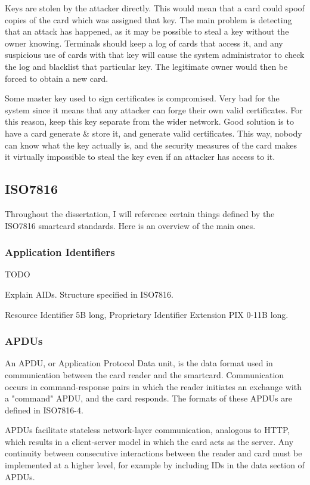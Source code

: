\documentclass[12pt]{article}
\begin{document}
Keys are stolen by the attacker directly. This would mean that a card could spoof copies of the card which was assigned that key. The main problem is detecting that an attack has happened, as it may be possible to steal a key without the owner knowing. Terminals should keep a log of cards that access it, and any suspicious use of cards with that key will cause the system administrator to check the log and blacklist that particular key. The legitimate owner would then be forced to obtain a new card.

Some master key used to sign certificates is compromised. Very bad for the system since it means that any attacker can forge their own valid certificates. For this reason, keep this key separate from the wider network. Good solution is to have a card generate \& store it, and generate valid certificates. This way, nobody can know what the key actually is, and the security measures of the card makes it virtually impossible to steal the key even if an attacker has access to it.


\subsection{ISO7816}
Throughout the dissertation, I will reference certain things defined by the ISO7816 smartcard standards. Here is an overview of the main ones.

\subsubsection{Application Identifiers}
\label{subsec:aid}
TODO

Explain AIDs. Structure specified in ISO7816.

Resource Identifier 5B long, Proprietary Identifier Extension PIX 0-11B long.

\subsubsection{APDUs}
An APDU, or Application Protocol Data unit, is the data format used in communication between the card reader and the smartcard. Communication occurs in command-response pairs in which the reader initiates an exchange with a "command" APDU, and the card responds. The formats of these APDUs are defined in ISO7816-4.

APDUs facilitate stateless network-layer communication, analogous to HTTP, which results in a client-server model in which the card acts as the server. Any continuity between consecutive interactions between the reader and card must be implemented at a higher level, for example by including IDs in the data section of APDUs.
\end{document}
